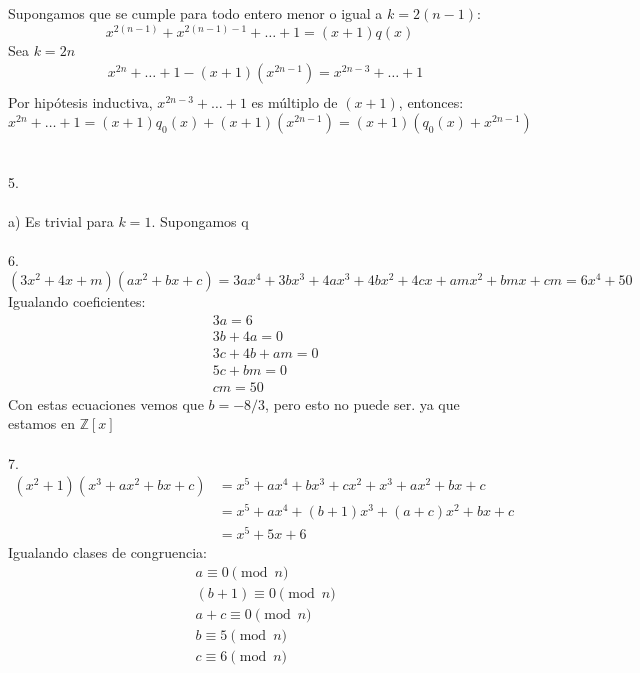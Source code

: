 \documentclass{article}
\begin{document}
Supongamos que se cumple para todo entero menor o igual a $k=2(n-1)$:
\begin{equation*}
    x^{2(n-1)}+x^{2(n-1)-1} + \dots + 1 = (x+1)q(x)
\end{equation*}
Sea $k=2n$
\begin{equation*}
\begin{aligned}
    &x^{2n} + \dots + 1 - (x+1)(x^{2n-1}) = x^{2n-3} + \dots +1 \\
\end{aligned}
\end{equation*}
Por hipótesis inductiva, $x^{2n-3} + \dots + 1$ es múltiplo de $(x+1)$, entonces:
\begin{equation*}
    x^{2n} + \dots + 1 = (x+1)q_{0}(x)+(x+1)(x^{2n-1}) = (x+1)(q_{0}(x)+x^{2n-1})
\end{equation*}
\\
\\
5.
\\
\\
a) Es trivial para $k=1$. Supongamos q
\\
\\
6.
\begin{equation*}
    (3x^2 + 4x +m)(ax^2 +bx +c)= 3ax^4 + 3bx^3 + 4ax^3 +4bx^2 +4cx +amx^2 +bmx + cm =6x^4 +50
\end{equation*}
Igualando coeficientes:
\begin{equation*}
\begin{aligned}
    &3a = 6 \\
    &3b+4a = 0 \\
    &3c +4b +am = 0 \\
    & 5c + bm = 0 \\
    &cm = 50
\end{aligned}
\end{equation*}
Con estas ecuaciones vemos que $b=-8/3$, pero esto no puede ser. ya que estamos en $\mathbb{Z}[x]$
\\
\\
7.
\begin{equation*}
\begin{aligned}
    (x^2 +1)(x^3 + ax^2 +bx +c)&=x^5 +ax^4 +bx^3 +cx^2 +x^3 +ax^2 +bx +c \\
    &= x^5 +ax^4 + (b+1)x^3 +(a+c)x^2 +bx +c \\
    &= x^5 +5x +6
\end{aligned}
\end{equation*}
Igualando clases de congruencia:
\begin{equation*}
\begin{aligned}
    &a \equiv 0 \pmod{n} \\
    &(b+1) \equiv 0 \pmod{n} \\
    &a+c \equiv 0 \pmod{n} \\
    &b \equiv 5 \pmod{n} \\
    & c \equiv 6 \pmod{n}
\end{aligned}
\end{equation*}
\end{document}
